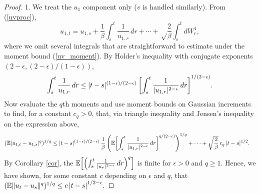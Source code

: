 \documentclass[11pt, twoside]{report}
\begin{document}
\begin{proof}   
 1. We treat the $u_1$ component only ($v$ is handled similarly). From (\ref{uvproc}),
\[
u_{1,t}=u_{1,s}+\frac 1\beta\int_s^t \frac{1}{ u_{1,r}}\,dr + \cdots+ \sqrt\frac{2}\beta\int_s^t dW^1_r,
\]
where we omit several integrals that are straightforward to estimate under the moment bound (\ref{uv_moment}). By Holder's inequality with conjugate exponents $(2-\epsilon, (2-\epsilon)/(1-\epsilon))$,
\[
\int_s^t \frac{1}{ u_{1,r}}\,dr 
\le |t-s|^{(1-\epsilon)/(2-\epsilon)}\,  {\left[\int_s^t\frac{1}{|u_{1,r}|^{2-\epsilon}} \,dr\right]^{1/(2-\epsilon)}}.
\]
Now evaluate the $q$th moments and use moment bounds on Gaussian increments to find, for a constant $c_q>0$, that, via triangle inequality and Jensen's inequality on the expression above,
\begin{align*}
(\mathbb E |u_{1,t}-u_{1,s}|^q)^{1/q}
&\le |t-s|^{(1-\epsilon)/(2-\epsilon)}\,\frac 1\beta\,  \pp{\mathbb{E} \bp{\int_s^t\frac{1}{|u_{1,r}|^{2-\epsilon}} \,dr}^{q/(2-\epsilon)}}^{1/q} + \cdots+\sqrt{\frac 2\beta}\,c_q\,|t-s|^{1/2}.
\end{align*}
By Corollary \ref{cor}, the $\mathbb{E} \bp{\pp{\int_s^t\frac{1}{|u_r|^{2-\epsilon}} \,dr}^q}$ is finite for $\epsilon>0$ and $q\ge 1$. Hence, we have shown, for some constant $c$ depending on $\epsilon$ and $q$, that
$(\mathbb E \|u_t-u_s\|^q)^{1/q}\le c\,\abs{t-s}^{1/2-\epsilon}.
$



\end{proof}
\end{document}
